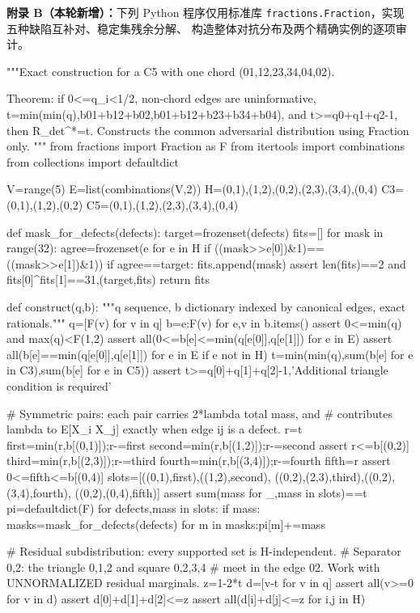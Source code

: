 \documentclass[11pt,a4paper]{ctexart}
\theoremstyle{remark}\newtheorem{remark}[theorem]{备注}
\begin{document}
\medskip
\noindent\textbf{附录 B（本轮新增）：}下列 Python 程序仅用标准库
\texttt{fractions.Fraction}，实现五种缺陷互补对、稳定集残余分解、
构造整体对抗分布及两个精确实例的逐项审计。
\begin{CodeListing}
"""Exact construction for a C5 with one chord (01,12,23,34,04,02).

Theorem: if 0<=q_i<1/2, non-chord edges are uninformative,
 t=min(min(q),b01+b12+b02,b01+b12+b23+b34+b04),
and t>=q0+q1+q2-1, then R_det^*=t.
Constructs the common adversarial distribution using Fraction only.
"""
from fractions import Fraction as F
from itertools import combinations
from collections import defaultdict

V=range(5)
E=list(combinations(V,2))
H={(0,1),(1,2),(0,2),(2,3),(3,4),(0,4)}
C3={(0,1),(1,2),(0,2)}
C5={(0,1),(1,2),(2,3),(3,4),(0,4)}

def mask_for_defects(defects):
    target=frozenset(defects)
    fits=[]
    for mask in range(32):
        agree=frozenset(e for e in H if ((mask>>e[0])&1)==((mask>>e[1])&1))
        if agree==target: fits.append(mask)
    assert len(fits)==2 and fits[0]^fits[1]==31,(target,fits)
    return fits

def construct(q,b):
    """q sequence, b dictionary indexed by canonical edges, exact rationals."""
    q=[F(v) for v in q]
    b={e:F(v) for e,v in b.items()}
    assert 0<=min(q) and max(q)<F(1,2)
    assert all(0<=b[e]<=min(q[e[0]],q[e[1]]) for e in E)
    assert all(b[e]==min(q[e[0]],q[e[1]]) for e in E if e not in H)
    t=min(min(q),sum(b[e] for e in C3),sum(b[e] for e in C5))
    assert t>=q[0]+q[1]+q[2]-1,'Additional triangle condition is required'

    # Symmetric pairs: each pair carries 2*lambda total mass, and
    # contributes lambda to E[X_i X_j] exactly when edge ij is a defect.
    r=t
    first=min(r,b[(0,1)]);r-=first
    second=min(r,b[(1,2)]);r-=second
    assert r<=b[(0,2)]
    third=min(r,b[(2,3)]);r-=third
    fourth=min(r,b[(3,4)]);r-=fourth
    fifth=r
    assert 0<=fifth<=b[(0,4)]
    slots=[({(0,1)},first),({(1,2)},second),
           ({(0,2),(2,3)},third),({(0,2),(3,4)},fourth),
           ({(0,2),(0,4)},fifth)]
    assert sum(mass for _,mass in slots)==t
    pi=defaultdict(F)
    for defects,mass in slots:
        if mass:
            masks=mask_for_defects(defects)
            for m in masks:pi[m]+=mass

    # Residual subdistribution: every supported set is H-independent.
    # Separator {0,2}: the triangle {0,1,2} and square {0,2,3,4}
    # meet in the edge 02.  Work with UNNORMALIZED residual marginals.
    z=1-2*t
    d=[v-t for v in q]
    assert all(v>=0 for v in d)
    assert d[0]+d[1]+d[2]<=z
    assert all(d[i]+d[j]<=z for i,j in H)


\end{CodeListing}
\end{document}
